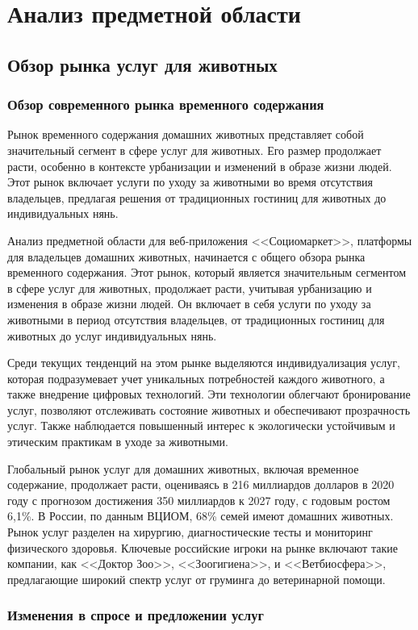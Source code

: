 \section{Анализ предметной области}
\subsection{Обзор рынка услуг для животных}
\subsubsection{Обзор современного рынка временного содержания}

Рынок временного содержания домашних животных представляет собой значительный сегмент в сфере услуг для животных. Его размер продолжает расти, особенно в контексте урбанизации и изменений в образе жизни людей. Этот рынок включает услуги по уходу за животными во время отсутствия владельцев, предлагая решения от традиционных гостиниц для животных до индивидуальных нянь.

Анализ предметной области для веб-приложения <<Социомаркет>>, платформы для владельцев домашних животных, начинается с общего обзора рынка временного содержания. Этот рынок, который является значительным сегментом в сфере услуг для животных, продолжает расти, учитывая урбанизацию и изменения в образе жизни людей. Он включает в себя услуги по уходу за животными в период отсутствия владельцев, от традиционных гостиниц для животных до услуг индивидуальных нянь.

Среди текущих тенденций на этом рынке выделяются индивидуализация услуг, которая подразумевает учет уникальных потребностей каждого животного, а также внедрение цифровых технологий. Эти технологии облегчают бронирование услуг, позволяют отслеживать состояние животных и обеспечивают прозрачность услуг. Также наблюдается повышенный интерес к экологически устойчивым и этическим практикам в уходе за животными.

Глобальный рынок услуг для домашних животных, включая временное содержание, продолжает расти, оцениваясь в 216 миллиардов долларов в 2020 году с прогнозом достижения 350 миллиардов к 2027 году, с годовым ростом 6,1\%​​. В России, по данным ВЦИОМ, 68\% семей имеют домашних животных. Рынок услуг разделен на хирургию, диагностические тесты и мониторинг физического здоровья​​. Ключевые российские игроки на рынке включают такие компании, как <<Доктор Зоо>>, <<Зоогигиена>>, и <<Ветбиосфера>>, предлагающие широкий спектр услуг от груминга до ветеринарной помощи.
\subsubsection{Изменения в спросе и предложении услуг}

